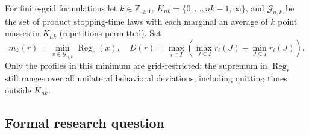 \documentclass[11pt,a4paper]{article}
\begin{document}
For finite-grid formulations let $k\in\mathbb Z_{\ge1}$,
$K_{nk}=\{0,\ldots,nk-1,\infty\}$, and $\mathcal G_{n,k}$ be the
set of product stopping-time laws with each marginal an average of
$k$ point masses in $K_{nk}$ (repetitions permitted). Set
\[
m_k(r)=\min_{x\in\mathcal G_{n,k}}\operatorname{Reg}_r(x),\quad
D(r)=\max_{i\in I}\left(\max_{J\subseteq I}r_i(J)
-\min_{J\subseteq I}r_i(J)\right).
\]
Only the profiles in this minimum are grid-restricted; the supremum
in $\operatorname{Reg}_r$ still ranges over all unilateral behavioral
deviations, including quitting times outside $K_{nk}$.

\subsection*{Formal research question}
\end{document}
